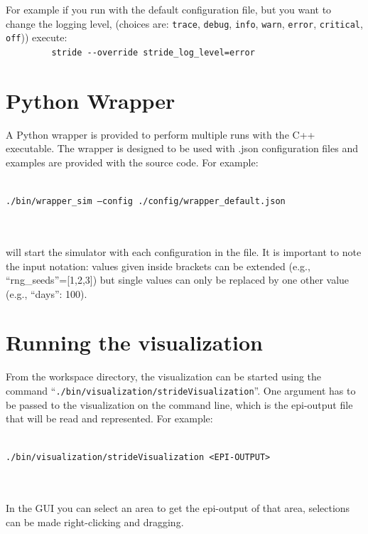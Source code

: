 For example if you run with the default configuration file, but you
want to change the logging level,
(choices are: \texttt{trace}, \texttt{debug}, \texttt{info}, \texttt{warn},
\texttt{error}, \texttt{critical}, \texttt{off})) execute:\\
\verb!         stride --override stride_log_level=error!


\section{Python Wrapper}
A Python wrapper is provided to perform multiple runs with the C++ executable.
The wrapper is designed to be used with .json configuration files and examples are provided with the source code.
For example: \\ \\
\centerline{\texttt{./bin/wrapper\_sim --config ./config/wrapper\_default.json}} \\ \\
will start the simulator with each configuration in the file.
It is important to note the input notation: values given inside brackets can be extended (e.g., ``rng\_seeds''=[1,2,3]) but single values can only be replaced by one other value (e.g., ``days'': 100).


\section{Running the visualization}	

From the workspace directory, the visualization can be started  using the command \mbox{``\texttt{./bin/visualization/strideVisualization}''}. One argument has to be passed to the visualization on the command line, which is the epi-output file that will be read and represented. For example: \\ \\
\centerline{\texttt{./bin/visualization/strideVisualization \textless EPI-OUTPUT\textgreater}} \\ \\
In the GUI you can select an area to get the epi-output of that area, selections can be made right-clicking and dragging.

